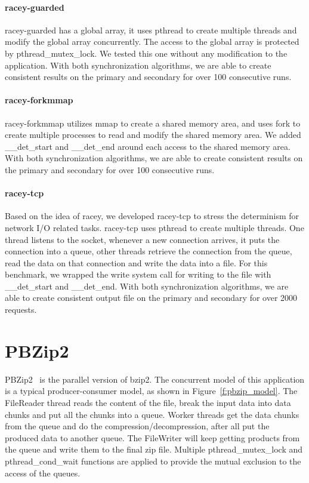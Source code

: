 \paragraph{racey-guarded} racey-guarded has a global array, it uses pthread to create multiple threads and modify the global array concurrently. The access to the global array is protected by pthread\_mutex\_lock. We tested this one without any modification to the application. With both synchronization algorithms, we are able to create consistent results on the primary and secondary for over 100 consecutive runs.

\paragraph{racey-forkmmap} racey-forkmmap utilizes mmap to create a shared memory area, and uses fork to create multiple processes to read and modify the shared memory area. We 	added \_\_det\_start and \_\_det\_end around each access to the shared memory area. With both synchronization algorithms, we are able to create consistent results on the primary and secondary for over 100 consecutive runs.

\paragraph{racey-tcp} Based on the idea of racey, we developed racey-tcp to stress the determinism for network I/O related tasks. racey-tcp uses pthread to create multiple threads. One thread listens to the socket, whenever a new connection arrives, it puts the connection into a queue, other threads retrieve the connection from the queue, read the data on that connection and write the data into a file. For this benchmark, we wrapped the write system call for writing to the file with \_\_det\_start and \_\_det\_end. With both synchronization algorithms, we are able to create consistent output file on the primary and secondary for over 2000 requests.

\section{PBZip2}
PBZip2~\cite{gilchristparallel} is the parallel version of bzip2. The concurrent model of this application is a typical producer-consumer model, as shown in Figure~\ref{f:pbzip_model}. The FileReader thread reads the content of the file, break the input data into data chunks and put all the chunks into a queue. Worker threads get the data chunks from the queue and do the compression/decompression, after all put the produced data to another queue. The FileWriter will keep getting products from the queue and write them to the final zip file. Multiple pthread\_mutex\_lock and pthread\_cond\_wait functions are applied to provide the mutual exclusion to the access of the queues.

